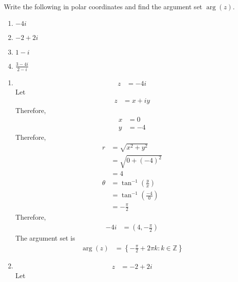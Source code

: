 \documentclass[fleqn, a4paper, 11pt, oneside]{amsart}
\theoremstyle{definition}
\theoremstyle{theorem}
\begin{document}
\setcounter{question}{4}
\begin{question}
	Write the following in polar coordinates and find the argument set $\arg(z)$.
	\begin{enumerate}
		\item $-4 i$
		\item $-2 + 2 i$
		\item $1 - i$
		\item $\frac{3 - 4 i}{2 - i}$
	\end{enumerate}
\end{question}

\begin{solution}
	\begin{enumerate}[leftmargin=*]
		\item
			\begin{align*}
				z & = -4 i
			\end{align*}
			Let
			\begin{align*}
				z & = x + i y
			\end{align*}
			Therefore,
			\begin{align*}
				x & = 0 \\
				y & = -4
			\end{align*}
			Therefore,
			\begin{align*}
				r      & = \sqrt{x^2 + y^2}                     \\
                                       & = \sqrt{0 + (-4)^2}                    \\
                                       & = 4                                    \\
				\theta & = \tan^{-1}\left( \frac{y}{x} \right)  \\
                                       & = \tan^{-1}\left( \frac{-4}{0} \right) \\
                                       & = -\frac{\pi}{2}
			\end{align*}
			Therefore,
			\begin{align*}
				-4 i & = \left( 4 , -\frac{\pi}{2} \right)
			\end{align*}
			The argument set is
			\begin{align*}
				\arg(z) & = \left\{ -\frac{\pi}{2} + 2 \pi k : k \in \mathbb{Z} \right\}
			\end{align*}
		\item
			\begin{align*}
				z & = -2 + 2 i
			\end{align*}
			Let
			\begin{align*}

\end{align*}
\end{enumerate}
\end{solution}
\end{document}
